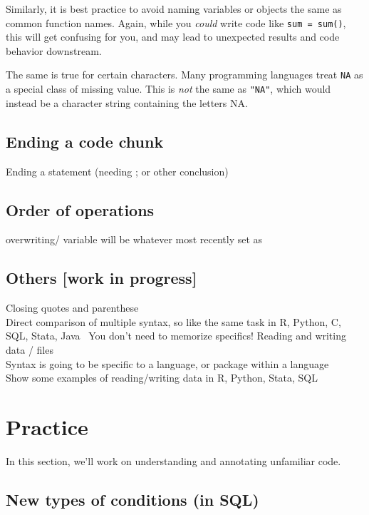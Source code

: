 \documentclass[
]{book}
\begin{document}
Similarly, it is best practice to avoid naming variables or objects the
same as common function names. Again, while you \emph{could} write code like
\texttt{sum\ =\ sum()}, this will get confusing for you, and may lead to
unexpected results and code behavior downstream.

The same is true for certain characters. Many programming languages
treat \texttt{NA} as a special class of missing value. This is \emph{not} the same
as \texttt{"NA"}, which would instead be a character string containing the
letters NA.

\section{Ending a code chunk}\label{ending-a-code-chunk}

Ending a statement (needing ; or other conclusion)

\section{Order of operations}\label{order-of-operations}

overwriting/ variable will be whatever most recently set as

\section{Others {[}work in progress{]}}\label{others-work-in-progress}

Closing quotes and parenthese\\
Direct comparison of multiple syntax, so like the same task in R,
Python, C, SQL, Stata, Java~ You don't need to memorize specifics!
Reading and writing data / files\\
Syntax is going to be specific to a language, or package within a
language\\
Show some examples of reading/writing data in R, Python, Stata, SQL

\chapter{Practice}\label{practice}

In this section, we'll work on understanding and annotating unfamiliar code.

\section{New types of conditions (in SQL)}\label{new-types-of-conditions-in-sql}
\end{document}
